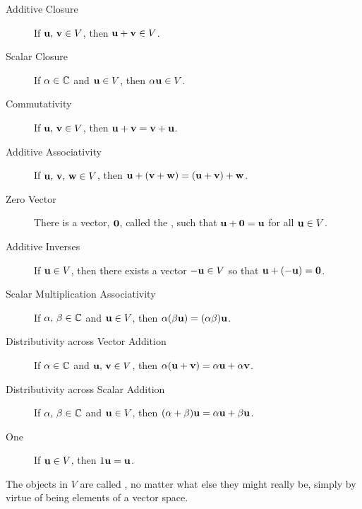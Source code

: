\documentclass{ximera}
\begin{document}
\begin{definition}
\begin{description}
\item[Additive Closure]
If $\mathbf{u},\,\mathbf{v}\in V$, then $\mathbf{u}+\mathbf{v}\in V$.
\item[Scalar Closure]
If $\alpha\in\mathbb{C}$ and $\mathbf{u}\in V$, then $\alpha\mathbf{u}\in V$.
\item[Commutativity]
If $\mathbf{u},\,\mathbf{v}\in V$, then $\mathbf{u}+\mathbf{v}=\mathbf{v}+\mathbf{u}$.
\item[Additive Associativity]
If $\mathbf{u},\,\mathbf{v},\,\mathbf{w}\in V$, then $\mathbf{u}+\left(\mathbf{v}+\mathbf{w}\right)=\left(\mathbf{u}+\mathbf{v}\right)+\mathbf{w}$.
\item[Zero Vector]
There is a vector, $\mathbf{0}$, called the , such that  $\mathbf{u}+\mathbf{0}=\mathbf{u}$  for all $\mathbf{u}\in V$.
\item[Additive Inverses]
If $\mathbf{u}\in V$, then there exists a vector $\mathbf{-u}\in V$ so that $\mathbf{u}+ (\mathbf{-u})=\mathbf{0}$.
\item[Scalar Multiplication Associativity]
If $\alpha,\,\beta\in\mathbb{C}$ and $\mathbf{u}\in V$, then $\alpha(\beta\mathbf{u})=(\alpha\beta)\mathbf{u}$.
\item[Distributivity across Vector Addition]
If $\alpha\in\mathbb{C}$ and $\mathbf{u},\,\mathbf{v}\in V$, then $\alpha(\mathbf{u}+\mathbf{v})=\alpha\mathbf{u}+\alpha\mathbf{v}$.
\item[Distributivity across Scalar Addition]
If $\alpha,\,\beta\in\mathbb{C}$ and $\mathbf{u}\in V$, then
$(\alpha+\beta)\mathbf{u}=\alpha\mathbf{u}+\beta\mathbf{u}$.
\item[One]
If $\mathbf{u}\in V$, then $1\mathbf{u}=\mathbf{u}$.
\end{description}

The objects in $V$ are called , no matter what else they might really be, simply by virtue of being elements of a vector space.

\end{definition}
\end{document}

